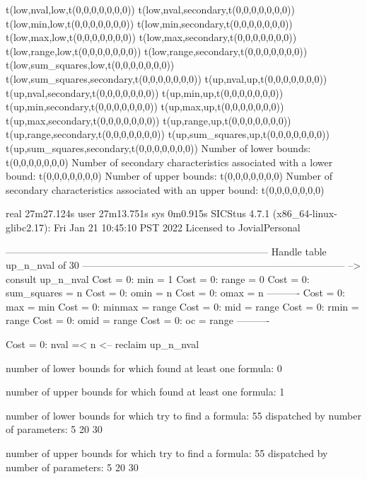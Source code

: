 t(low,nval,low,t(0,0,0,0,0,0,0))
t(low,nval,secondary,t(0,0,0,0,0,0,0))
t(low,min,low,t(0,0,0,0,0,0,0))
t(low,min,secondary,t(0,0,0,0,0,0,0))
t(low,max,low,t(0,0,0,0,0,0,0))
t(low,max,secondary,t(0,0,0,0,0,0,0))
t(low,range,low,t(0,0,0,0,0,0,0))
t(low,range,secondary,t(0,0,0,0,0,0,0))
t(low,sum_squares,low,t(0,0,0,0,0,0,0))
t(low,sum_squares,secondary,t(0,0,0,0,0,0,0))
t(up,nval,up,t(0,0,0,0,0,0,0))
t(up,nval,secondary,t(0,0,0,0,0,0,0))
t(up,min,up,t(0,0,0,0,0,0,0))
t(up,min,secondary,t(0,0,0,0,0,0,0))
t(up,max,up,t(0,0,0,0,0,0,0))
t(up,max,secondary,t(0,0,0,0,0,0,0))
t(up,range,up,t(0,0,0,0,0,0,0))
t(up,range,secondary,t(0,0,0,0,0,0,0))
t(up,sum_squares,up,t(0,0,0,0,0,0,0))
t(up,sum_squares,secondary,t(0,0,0,0,0,0,0))
Number of lower bounds:                                             t(0,0,0,0,0,0,0)
Number of secondary characteristics associated with a lower bound:  t(0,0,0,0,0,0,0)
Number of upper bounds:                                             t(0,0,0,0,0,0,0)
Number of secondary characteristics associated with an upper bound: t(0,0,0,0,0,0,0)

real	27m27.124s
user	27m13.751s
sys	0m0.915s
SICStus 4.7.1 (x86_64-linux-glibc2.17): Fri Jan 21 10:45:10 PST 2022
Licensed to JovialPersonal


--------------------------------------------------------------------------------
Handle table up_n_nval of 30
--------------------------------------------------------------------------------
--> consult up_n_nval
Cost =  0:  min         = 1
Cost =  0:  range       = 0
Cost =  0:  sum_squares = n
Cost =  0:  omin        = n
Cost =  0:  omax        = n
----------
Cost =  0:  max         = min
Cost =  0:  minmax      = range
Cost =  0:  mid         = range
Cost =  0:  rmin        = range
Cost =  0:  omid        = range
Cost =  0:  oc          = range
----------

Cost =  0:  nval =< n
<-- reclaim up_n_nval

number of lower bounds for which found at least one formula: 0

number of upper bounds for which found at least one formula: 1

number of lower bounds for which try to find a formula: 55
dispatched by number of parameters: 5  20  30

number of upper bounds for which try to find a formula: 55
dispatched by number of parameters: 5  20  30

